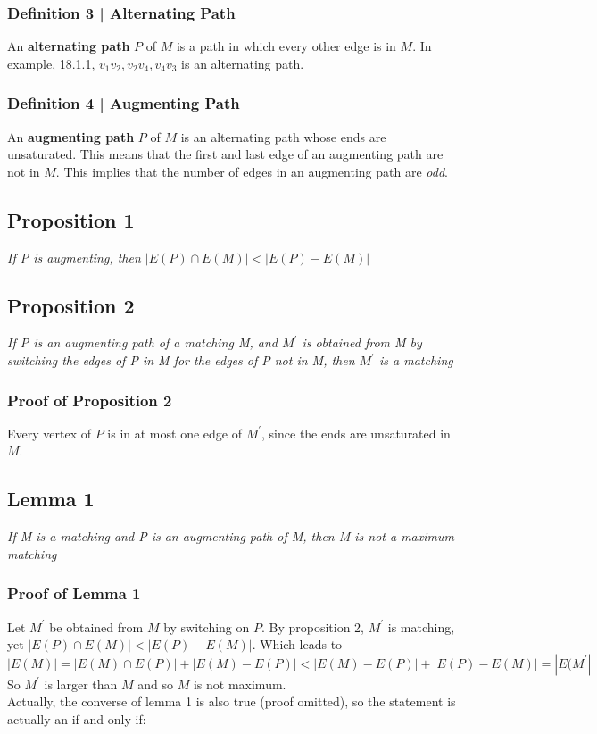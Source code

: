 \documentclass{report}
\begin{document}
\subsubsection{Definition 3 | Alternating Path}
An \textbf{alternating path} $P$ of $M$ is a path in which every other edge is in $M$. In example, 18.1.1, $v_1v_2, v_2v_4, v_4v_3$ is an alternating path.
\subsubsection{Definition 4 | Augmenting Path}
An \textbf{augmenting path} $P$ of $M$ is an alternating path whose ends are unsaturated. This means that the first and last edge of an augmenting path are not in $M$. This implies that the number of edges in an augmenting path are \textit{odd}.
\subsection{Proposition 1}
\begin{center}
\textit{If P is augmenting, then $|E(P) \cap E(M)|<|E(P) - E(M)|$}
\end{center}
\subsection{Proposition 2}
\begin{center}
\textit{If P is an augmenting path of a matching M, and $M^\prime$ is obtained from M by switching the edges of P in M for the edges of P not in M, then $M^\prime$ is a matching}
\end{center}
\subsubsection{Proof of Proposition 2}
Every vertex of $P$ is in at most one edge of $M^\prime$, since the ends are unsaturated in $M$.
\subsection{Lemma 1}
\begin{center}
\textit{If M is a matching and P is an augmenting path of M, then M is not a maximum matching}
\end{center}
\subsubsection{Proof of Lemma 1}
Let $M^\prime$ be obtained from $M$ by switching on $P$. By proposition 2, $M^\prime$ is matching, yet $|E(P) \cap E(M)|<|E(P) - E(M)|$. Which leads to
$$|E(M)| = |E(M) \cap E(P)| + |E(M) - E(P)| < |E(M) - E(P)| + |E(P) - E(M)| = |E(M^\prime|$$ So $M^\prime$ is larger than $M$ and so $M$ is not maximum.\\
Actually, the converse of lemma 1 is also true (proof omitted), so the statement is actually an if-and-only-if:
\end{document}
